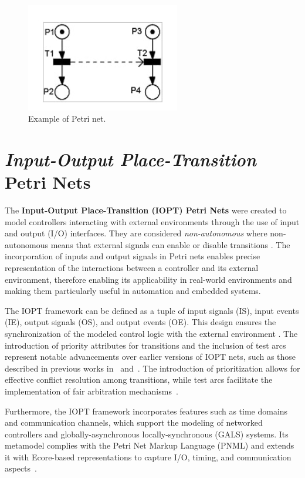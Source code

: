 \begin{figure}[htbp]
  \centering
  \includegraphics[width=0.6\textwidth]{Chapters/Figures/petrinet.jpg}
  \caption{Example of Petri net.}
  \label{fig:petrinet}
\end{figure}

\section{\emph{Input-Output Place-Transition} Petri Nets}
\label{sec:iopt_petri_nets}


The \textbf{Input-Output Place-Transition (IOPT) Petri Nets} were created to model controllers interacting with external environments through the use of input and output (I/O) interfaces\cite{iopttools}. They are considered \emph{non-autonomous}  where non-autonomous means that external signals can enable or disable transitions \cite{2015gomes}. The incorporation of inputs and output signals in Petri nets enables precise representation of the interactions between a controller and its external environment, therefore enabling its applicability in real-world environments  and making them particularly useful in automation and embedded systems\cite{iopttools}.


The IOPT framework can be defined as a tuple of input signals (IS), input events (IE), output signals (OS), and output events (OE). This design ensures the synchronization of the modeled control logic with the external environment \cite{iopttools}. The introduction of priority attributes for transitions and the inclusion of test arcs represent notable advancements over earlier versions of IOPT nets, such as those described in previous works in~\cite{barros2004} and~\cite{bg2005}. The introduction of prioritization allows for effective conflict resolution among transitions, while test arcs facilitate the implementation of fair arbitration mechanisms~\cite{conflict}.

Furthermore, the IOPT framework incorporates features such as time domains and communication channels, which support the modeling of networked controllers and globally-asynchronous locally-synchronous (GALS) systems. Its metamodel complies with the Petri Net Markup Language (PNML) and extends it with Ecore-based representations to capture I/O, timing, and communication aspects~\cite{iopttools}.




